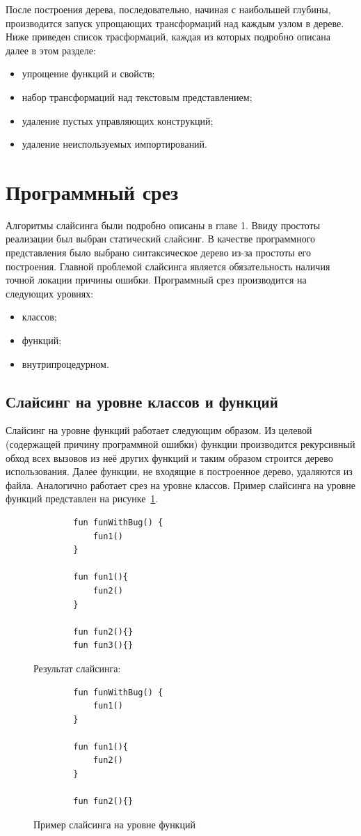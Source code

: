 После построения дерева, последовательно, начиная с наибольшей глубины, производится запуск упрощающих трансформаций над каждым узлом в дереве. Ниже приведен список трасформаций, каждая из которых подробно описана далее в этом разделе:
\begin{itemize}
	\item упрощение функций и свойств;
	\item набор трансформаций над текстовым представлением;
	\item удаление пустых управляющих конструкций;
	\item удаление неиспользуемых импортирований.
\end{itemize}

\section{Программный срез}
Алгоритмы слайсинга были подробно описаны в главе 1. Ввиду простоты реализации был выбран статический слайсинг. В качестве программного представления было выбрано синтаксическое дерево из-за простоты его построения. Главной проблемой слайсинга является обязательность наличия точной локации причины ошибки.
Программный срез производится на следующих уровнях:
\begin{itemize}
	\item классов;
	\item функций;
	\item внутрипроцедурном.
\end{itemize}
\subsection{Слайсинг на уровне классов и функций}
Слайсинг на уровне функций работает следующим образом. Из целевой (содержащей причину программной ошибки) функции производится рекурсивный обход всех вызовов из неё других функций и таким образом строится дерево использования. Далее функции, не входящие в построенное дерево, удаляются из файла. Аналогично работает срез на уровне классов. Пример слайсинга на уровне функций представлен на рисунке~\ref{funslicing}.
\begin{figure}
	\begin{lstlisting}
		fun funWithBug() {
			fun1()
		}
		
		fun fun1(){
			fun2()		
		}
		
		fun fun2(){}
		fun fun3(){}
	\end{lstlisting}
	Результат слайсинга:
	\begin{lstlisting}
		fun funWithBug() {
			fun1()
		}
		
		fun fun1(){
			fun2()		
		}
		
		fun fun2(){}
	\end{lstlisting}
	\caption{\label{funslicing}Пример слайсинга на уровне функций}
\end{figure}
